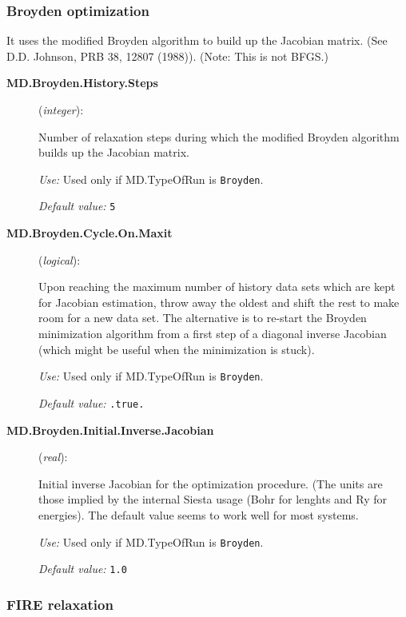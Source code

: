 \subsubsection{Broyden optimization}

It uses the modified Broyden algorithm to
build up the Jacobian matrix. (See D.D. Johnson, PRB 38, 12807
(1988)). (Note: This is not BFGS.)

\begin{description}
\item [\textbf{MD.Broyden.History.Steps}] (\textit{integer}):

Number of relaxation steps during which the modified Broyden algorithm
builds up the Jacobian matrix.

\textit{Use:} Used only if MD.TypeOfRun is \texttt{Broyden}.

\textit{Default value:} \texttt{5}

\item [\textbf{MD.Broyden.Cycle.On.Maxit}] (\textit{logical}):

Upon reaching the maximum number of history data sets which are kept
for Jacobian estimation, throw away the oldest and shift the rest to
make room for a new data set. The alternative is to re-start the
Broyden minimization algorithm from a first step of a diagonal inverse
Jacobian (which might be useful when the minimization is
stuck).

\textit{Use:} Used only if MD.TypeOfRun is \texttt{Broyden}.

\textit{Default value:} \texttt{.true.}

\item[\textbf{MD.Broyden.Initial.Inverse.Jacobian}] (\textit{real}):

Initial inverse Jacobian for the optimization procedure. (The units
are those implied by the internal Siesta usage (Bohr for lenghts and
Ry for energies). The default value seems to work well for most systems.

\textit{Use:} Used only if MD.TypeOfRun is \texttt{Broyden}.

\textit{Default value:} \texttt{1.0}


\end{description}

\subsubsection{FIRE relaxation}

